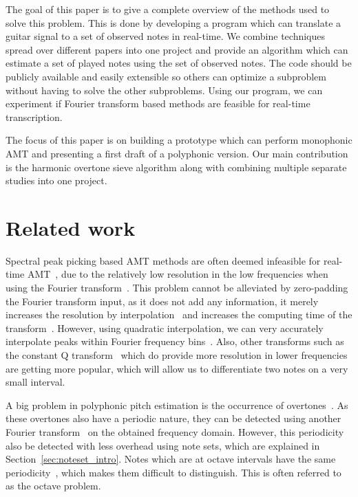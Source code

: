\documentclass[10pt,twocolumn]{article}
\begin{document}
The goal of this paper is to give a complete overview of the methods used to solve this problem. This is done by developing a program which can translate a guitar signal to a set of observed notes in real-time. We combine techniques spread over different papers into one project and provide an algorithm which can estimate a set of played notes using the set of observed notes. The code should be publicly available and easily extensible so others can optimize a subproblem without having to solve the other subproblems. Using our program, we can experiment if Fourier transform based methods are feasible for real-time transcription.

The focus of this paper is on building a prototype which can perform monophonic AMT and presenting a first draft of a polyphonic version. Our main contribution is the harmonic overtone sieve algorithm along with combining multiple separate studies into one project.


\section{Related work}
Spectral peak picking based AMT methods are often deemed infeasible for real-time AMT~\cite{hater}, due to the relatively low resolution in the low frequencies when using the Fourier transform~\cite{theoretisch}. This problem cannot be alleviated by zero-padding the Fourier transform input, as it does not add any information, it merely increases the resolution by interpolation~\cite{infomax}\cite{infomax2} and increases the computing time of the transform~\cite{boek}. However, using quadratic interpolation, we can very accurately interpolate peaks within Fourier frequency bins~\cite{interpol}. Also, other transforms such as the constant Q transform~\cite{cqt} which do provide more resolution in lower frequencies are getting more popular, which will allow us to differentiate two notes on a very small interval.

A big problem in polyphonic pitch estimation is the occurrence of overtones~\cite{oud}. As these overtones also have a periodic nature, they can be detected using another Fourier transform~\cite{double} on the obtained frequency domain. However, this periodicity also be detected with less overhead using note sets, which are explained in Section~\ref{sec:noteset_intro}. Notes which are at octave intervals have the same periodicity~\cite{octave}, which makes them difficult to distinguish. This is often referred to as the octave problem.
\end{document}
